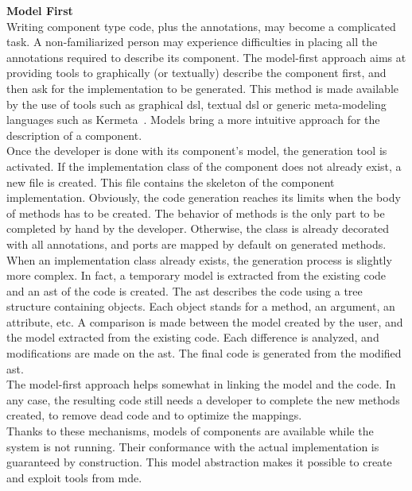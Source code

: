 {\bf Model First}\\
Writing component type code, plus the annotations, may become a complicated task. A non-familiarized person may experience difficulties in placing all the annotations required to describe its component.
The model-first approach aims at providing tools to graphically (or textually) describe the component first, and then ask for the implementation to be generated. This method is made available by the use of tools such as graphical \gls{dsl}, textual \gls{dsl} or generic meta-modeling languages such as Kermeta~\cite{Muller05a}. Models bring a more intuitive approach for the description of a component.\\ 
Once the developer is done with its component's model, the generation tool is activated. If the implementation class of the component does not already exist, a new file is created. This file contains the skeleton of the component implementation. Obviously, the code generation reaches its limits when the body of methods has to be created. The behavior of methods is the only part to be completed by hand by the developer. Otherwise, the class is already decorated with all annotations, and ports are mapped by default on generated methods.\\
When an implementation class already exists, the generation process is slightly more complex. In fact, a temporary model is extracted from the existing code and an \gls{ast} of the code is created. The \gls{ast} describes the code using a tree structure containing objects. Each object stands for a method, an argument, an attribute, etc. A comparison is made between the model created by the user, and the model extracted from the existing code. Each difference is analyzed, and modifications are made on the \gls{ast}. The final code is generated from the modified \gls{ast}.\\
The model-first approach helps somewhat in linking the model and the code. In any case, the resulting code still needs a developer to complete the new methods created, to remove dead code and to optimize the mappings.\\

Thanks to these mechanisms, models of components are available while the system is not running. Their conformance with the actual implementation is guaranteed by construction. This model abstraction makes it possible to create and exploit tools from \gls{mde}.\\

